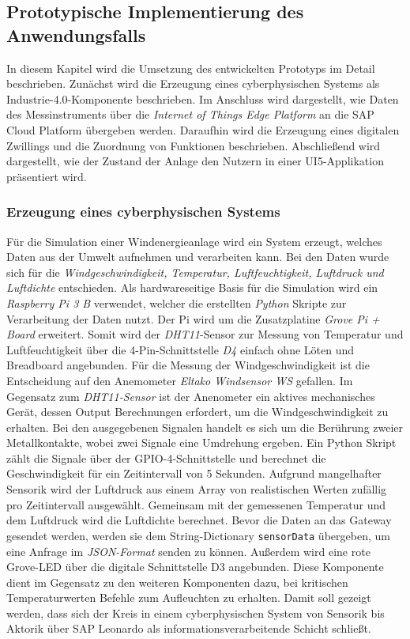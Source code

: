 

\subsection{Prototypische Implementierung des Anwendungsfalls}

In diesem Kapitel wird die Umsetzung des entwickelten Prototyps im Detail beschrieben.
Zunächst wird die Erzeugung eines cyberphysischen Systems als Industrie-4.0-Komponente beschrieben. Im Anschluss wird dargestellt, wie Daten des Messinstruments über die \textit{Internet of Things Edge Platform} an die SAP Cloud Platform übergeben werden. Daraufhin wird die Erzeugung eines digitalen Zwillings und die Zuordnung von Funktionen beschrieben. Abschließend wird dargestellt, wie der Zustand der Anlage den Nutzern in einer UI5-Applikation präsentiert wird.

\subsubsection{Erzeugung eines cyberphysischen Systems}

Für die Simulation einer Windenergieanlage wird ein System erzeugt, welches Daten aus der Umwelt aufnehmen und verarbeiten kann. Bei den Daten wurde sich für die \textit{Windgeschwindigkeit, Temperatur, Luftfeuchtigkeit, Luftdruck und Luftdichte} entschieden.
Als hardwareseitige Basis für die Simulation wird ein \textit{Raspberry Pi 3 B} verwendet, welcher die erstellten \textit{Python} Skripte zur Verarbeitung der Daten nutzt. Der Pi wird um die Zusatzplatine \textit{Grove Pi + Board} erweitert. Somit wird der \textit{DHT11}-Sensor zur Messung von Temperatur und Luftfeuchtigkeit über die 4-Pin-Schnittstelle \textit{D4} einfach ohne Löten und Breadboard angebunden. Für die Messung der Windgeschwindigkeit ist die Entscheidung auf den Anemometer \textit{Eltako Windsensor WS} gefallen. Im Gegensatz zum \textit{DHT11-Sensor} ist der Anenometer ein aktives mechanisches Gerät, dessen Output Berechnungen erfordert, um die Windgeschwindigkeit zu erhalten. Bei den ausgegebenen Signalen handelt es sich um die Berührung zweier Metallkontakte, wobei zwei Signale eine Umdrehung ergeben. Ein Python Skript zählt die Signale über der GPIO-4-Schnittstelle und berechnet die Geschwindigkeit für ein Zeitintervall von 5 Sekunden. Aufgrund mangelhafter Sensorik wird der Luftdruck aus einem Array von realistischen Werten zufällig pro Zeitintervall ausgewählt. Gemeinsam mit der gemessenen Temperatur und dem Luftdruck wird die Luftdichte berechnet. Bevor die Daten an das Gateway gesendet werden, werden sie dem String-Dictionary \texttt{sensorData} übergeben, um eine Anfrage im \textit{JSON-Format} senden zu können.
 Außerdem wird eine rote Grove-LED über die digitale Schnittstelle D3 angebunden. Diese Komponente dient im Gegensatz zu den weiteren Komponenten dazu, bei kritischen Temperaturwerten Befehle zum Aufleuchten zu erhalten. Damit soll gezeigt werden, dass sich der Kreis in einem cyberphysischen System von Sensorik bis Aktorik über SAP Leonardo als informationsverarbeitende Schicht schließt.

